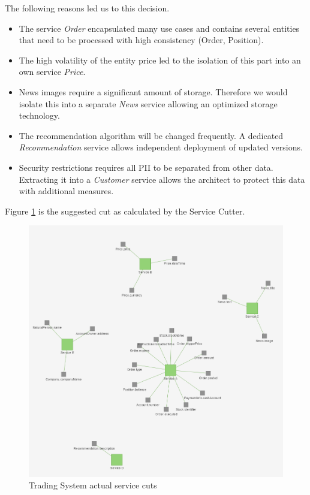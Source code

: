 The following reasons led us to this decision.
\begin{itemize}
	\item The service \textit{Order} encapsulated many use cases and contains several entities that need to be processed with high consistency (Order, Position).
	\item The high volatility of the entity price led to the isolation of this part into an own service \textit{Price}.
	\item News images require a significant amount of storage. Therefore we would isolate this into a separate \textit{News} service allowing an optimized storage technology.
	\item The recommendation algorithm will be changed frequently. A dedicated \textit{Recommendation} service allows independent deployment of updated versions.
	\item Security restrictions requires all \gls{PII} to be separated from other data. Extracting it into a \textit{Customer} service allows the architect to protect this data with additional measures.
\end{itemize}

Figure \ref{fig:tradingCutsTool} is the suggested cut as calculated by the Service Cutter. 

\begin{figure}[H]
	\includegraphics[scale=0.5]{images/trading_service_cut.png}
	\caption{Trading System actual service cuts}
	\label{fig:tradingCutsTool}
\end{figure}

